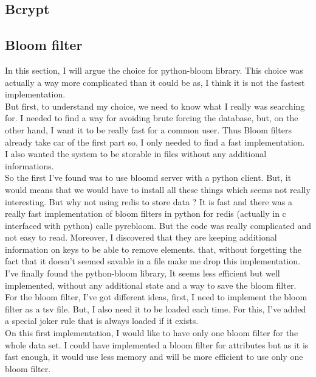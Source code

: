 \documentclass{eplmastersthesis}
\begin{document}
\subsection{Bcrypt}

\subsection{Bloom filter}
In this section, I will argue the choice for python-bloom library. This choice was actually a way more complicated than it could be as, I think it is not the fastest implementation.\\
But first, to understand my choice, we need to know what I really was searching for. I needed to find a way for avoiding brute forcing the database, but, on the other hand, I want it to be really fast for a common user. Thus Bloom filters already take car of the first part so, I only needed to find a fast implementation.\\
I also wanted the system to be storable in files without any additional informations.\\
So the first I've found was to use bloomd server with a python client. But, it would means that we would have to install all these things which seems not really interesting. But why not using redis to store data ? It is fast and there was a really fast implementation of bloom filters in python for redis (actually in c interfaced with python) calle pyrebloom. But the code was really complicated and not easy to read. Moreover, I discovered that they are keeping additional information on keys to be able to remove elements. that, without forgetting the fact that it doesn't seemed savable in a file make me drop this implementation.\\
I've finally found the python-bloom library, It seems less efficient but well implemented, without any additional state and a way to save the bloom filter.\\

For the bloom filter, I've got different ideas, first, I need to implement the bloom filter as a tsv file. But, I also need it to be loaded each time. For this, I've added a special joker rule that is always loaded if it exists.\\
On this first implementation, I would like to have only one bloom filter for the whole data set. I could have implemented a bloom filter for attributes but as it is fast enough, it would use less memory and will be more efficient to use only one bloom filter.\\
\end{document}
